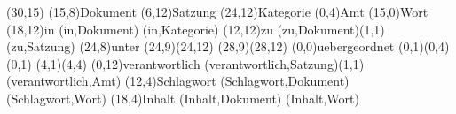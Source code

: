\documentclass[a4paper,11pt]{article}
\begin{document}
\setlength{\hermunit}{.5cm}
\begin{schema}(30,15)
\entity(15,8){Dokument}
%
\entity(6,12){Satzung}
%
\entity(24,12){Kategorie}
%
\entity(0,4){Amt}
%
\entity(15,0){Wort}
%
\relation(18,12){in}
\conn(in,Dokument){}
\conn(in,Kategorie){}
%
\relation(12,12){zu}
\conn(zu,Dokument){(1,1)}
\conn(zu,Satzung){}
%
\relation(24,8){unter}
\conn*(24,9)(24,12){}
\conn*(28,9)(28,12){}
%
\relation(0,0){uebergeordnet}
\conn*(0,1)(0,4){(0,1)}
\conn*(4,1)(4,4){}
%
\relation(0,12){verantwortlich}
\conn(verantwortlich,Satzung){(1,1)}
\conn(verantwortlich,Amt){}
%
\relation(12,4){Schlagwort}
\conn(Schlagwort,Dokument){}
\conn(Schlagwort,Wort){}
%
\relation(18,4){Inhalt}
\conn(Inhalt,Dokument){}
\conn(Inhalt,Wort){}
\end{schema}
\end{document}
